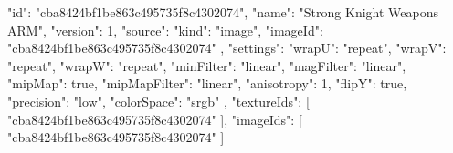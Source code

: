 {
  "id": "cba8424bf1be863c495735f8c4302074",
  "name": "Strong Knight Weapons ARM",
  "version": 1,
  "source": {
    "kind": "image",
    "imageId": "cba8424bf1be863c495735f8c4302074"
  },
  "settings": {
    "wrapU": "repeat",
    "wrapV": "repeat",
    "wrapW": "repeat",
    "minFilter": "linear",
    "magFilter": "linear",
    "mipMap": true,
    "mipMapFilter": "linear",
    "anisotropy": 1,
    "flipY": true,
    "precision": "low",
    "colorSpace": "srgb"
  },
  "textureIds": [
    "cba8424bf1be863c495735f8c4302074"
  ],
  "imageIds": [
    "cba8424bf1be863c495735f8c4302074"
  ]
}
